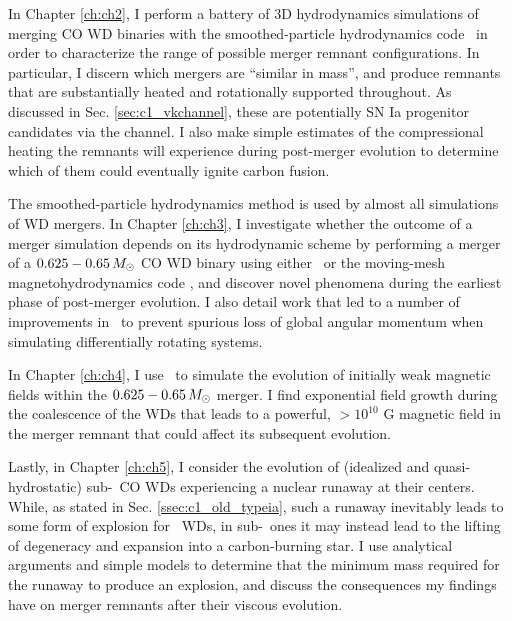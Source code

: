 
In Chapter \ref{ch:ch2}, I perform a battery of 3D hydrodynamics simulations of merging CO WD binaries with the smoothed-particle hydrodynamics code \gasoline\ in order to characterize the range of possible merger remnant configurations.  In particular, I discern which mergers are ``similar in mass'', and produce remnants that are substantially heated and rotationally supported throughout.  As discussed in Sec. \ref{sec:c1_vkchannel}, these are potentially SN Ia progenitor candidates via the \citeal{vkercj10} channel.  I also make simple estimates of the compressional heating the remnants will experience during post-merger evolution to determine which of them could eventually ignite carbon fusion.

The smoothed-particle hydrodynamics method is used by almost all simulations of WD mergers.  In Chapter \ref{ch:ch3}, I investigate whether the outcome of a merger simulation depends on its hydrodynamic scheme by performing a merger of a $0.625 - 0.65\,\Msun$ CO WD binary using either \gasoline\ or the moving-mesh magnetohydrodynamics code \arepo, and discover novel phenomena during the earliest phase of post-merger evolution.  I also detail work that led to a number of improvements in \arepo\ to prevent spurious loss of global angular momentum when simulating differentially rotating systems.

In Chapter \ref{ch:ch4}, I use \arepo\ to simulate the evolution of initially weak magnetic fields within the $0.625 - 0.65\,\Msun$ merger.  I find exponential field growth during the coalescence of the WDs that leads to a powerful, $>10^{10}$ G magnetic field in the merger remnant that could affect its subsequent evolution.

Lastly, in Chapter \ref{ch:ch5}, I consider the evolution of (idealized and quasi-hydrostatic) sub-\Mch\ CO WDs experiencing a nuclear runaway at their centers.  While, as stated in Sec. \ref{ssec:c1_old_typeia}, such a runaway inevitably leads to some form of explosion for \Mch\ WDs, in sub-\Mch\ ones it may instead lead to the lifting of degeneracy and expansion into a carbon-burning star.  I use analytical arguments and simple models to determine that the minimum mass required for the runaway to produce an explosion, and discuss the consequences my findings have on merger remnants after their viscous evolution.

